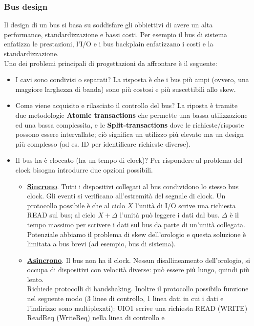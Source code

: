 \subsubsection{Bus design}
Il design di un bus si basa su soddisfare gli obbiettivi di avere un alta performance, standardizzazione e bassi costi. Per esempio 
il bus di sistema enfatizza le prestazioni, l'I/O e i bus backplain enfatizzano i costi e la standardizzazione.\\
Uno dei problemi principali di progettazioni da affrontare è il seguente: 
\begin{itemize}
    \item I cavi sono condivisi o separati? La risposta è che i bus più ampi (ovvero, una maggiore larghezza di banda) sono più costosi e più suscettibili allo skew.
    \item Come viene acquisito e rilasciato il controllo del bus? La riposta è tramite due metodologie \textbf{Atomic transactions} che permette una bassa utilizzazione ed una bassa complessita, e le \textbf{Split-transactions}
    dove le richieste/risposte possono essere intervallate; ciò significa un utilizzo più elevato ma un design più complesso (ad es. ID per identificare richieste diverse).
    \item Il bus ha è cloccato (ha un tempo di clock)? Per rispondere al problema del clock bisogna introdurre due opzioni possibili.
    \begin{itemize}
        \item \underline{\textbf{Sincrono}}. Tutti i dispositivi collegati al bus condividono lo stesso bus clock. Gli eventi si verificano all'estremità del segnale di clock. Un protocollo possibile è che al ciclo \(X\) l'unità di I/O scrive una richiesta READ sul bus; al ciclo \(X + \Delta\) l'unità può leggere i dati dal bus.
        \(\Delta\) è il tempo massimo per scrivere i dati sul bus da parte di un'unità collegata.\\
        Potenziale abbiamo il problema di skew dell'orologio e questa soluzione è limitata a bus brevi (ad esempio, bus di sistema).
        \item \underline{\textbf{Asincrono}}. Il bus non ha il clock. Nessun disallineamento dell'orologio, si occupa di dispositivi con velocità diverse: può essere più lungo, quindi più lento. \\
        Richiede protocolli di handshaking. Inoltre il protocollo possibilo funzione nel seguente modo (3 linee di controllo, 1 linea dati in cui i dati e l'indirizzo sono multiplexati): UIO1 scrive una richiesta READ (WRITE) ReadReq (WriteReq) nella linea di controllo e 

\end{itemize}
\end{itemize}
